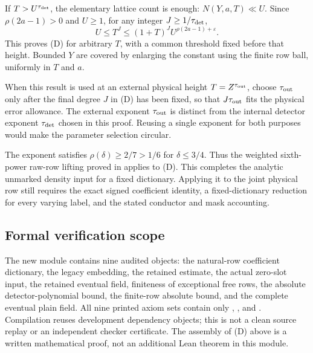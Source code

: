 If $T>U^{\tau_{\rm det}}$, the elementary lattice count is enough:
$N(Y,a,T)\ll U$. Since $\rho(2a-1)>0$ and $U\ge1$, for any integer
$J\ge1/\tau_{\rm det}$,
\[
 U\le T^J\le(1+T)^JU^{\rho(2a-1)+\varepsilon}.
\]
This proves (D) for arbitrary $T$, with a common threshold fixed before
that height. Bounded $Y$ are covered by enlarging the constant using the
finite row ball, uniformly in $T$ and $a$.

When this result is used at an external physical height $T=Z^{\tau_{\rm out}}$,
choose $\tau_{\rm out}$ only after the final degree $J$ in (D) has been
fixed, so that $J\tau_{\rm out}$ fits the physical error allowance. The
external exponent $\tau_{\rm out}$ is distinct from the internal detector
exponent $\tau_{\rm det}$ chosen in this proof. Reusing a single exponent
for both purposes would make the parameter selection circular.

The exponent satisfies $\rho(\delta)\ge2/7>1/6$ for
$\delta\le3/4$. Thus the weighted sixth-power raw-row lifting proved in
 applies to (D). This completes the
analytic unmarked density input for a fixed dictionary. Applying it to the
joint physical row still requires the exact signed coefficient identity,
a fixed-dictionary reduction for every varying label, and the stated
conductor and mask accounting.

\subsection{Formal verification scope}

The new module  contains nine audited
objects: the natural-row coefficient dictionary, the legacy embedding, the retained estimate, the actual zero-slot
input, the retained eventual field, finiteness of exceptional free rows,
the absolute detector-polynomial bound, the finite-row absolute bound, and
the complete eventual plain field. All nine printed axiom sets contain
only , , and .
Compilation reuses development dependency objects; this is not a clean
source replay or an independent checker certificate. The assembly of (D)
above is a written mathematical proof, not an additional Lean theorem in
this module.
